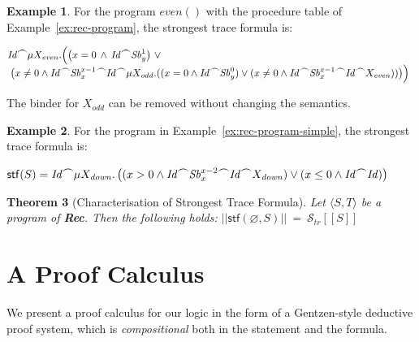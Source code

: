 \documentclass[10pt,a4paper]{amsart}
\newtheorem{theorem}{Theorem}[section]
\theoremstyle{definition}
\newtheorem{example}[theorem]{Example}
\newcommand{\denot}[1]{\left[\!\left[#1\right]\!\right]}
\newcommand{\fdenot}[1]{\left|\!\left|#1\right|\!\right|}
\newcommand{\trcdenot}[1]{\mathcal{S}_{\mathit{tr}}\!\denot{#1}}
\newcommand{\chop}[0]{\raisebox{1ex}{$\frown$}}
\newcommand{\stfs}[1]{\mathsf{stf} (#1)}
\newcommand{\stfh}[2]{\mathsf{stf}(#1, #2)}
\newcommand{\Rec}{\mbox{\bf Rec}}
\begin{document}
\begin{example}\label{ex:stf-rec}
  For the program $\mathit{even}()$ with the procedure table of
  Example~\ref{ex:rec-program}, the strongest trace formula is:

  \noindent
  $
  \begin{array}{@{}l@{}l}
    & \mathit{Id} \chop \mu X_\mathit{even}.\Bigl( 
    \bigl(x = 0 \,\land\,\mathit{Id} \chop \mathit{Sb}^{1}_{y}\bigl)\ \lor\\ 
   & \;\bigl(x \neq 0 \land
     \mathit{Id} \chop \mathit{Sb}^{x-1}_{x} \chop \mathit{Id} \chop \mu X_{\mathit{odd}}.((x = 0 \land \mathit{Id} \chop \mathit{Sb}^{0}_{y}) \lor
  (x \neq 0 \land 
     \mathit{Id} \chop \mathit{Sb}^{x-1}_{x} \chop\mathit{Id}\chop X_{\mathit{even}}))\bigr)\Bigr)
\end{array}
$

\noindent The binder for $X_{odd}$ can be removed without changing the
semantics.
\end{example}

\begin{example}\label{ex:stf-rec-simple}
  For the program in Example~\ref{ex:rec-program-simple}, the
  strongest trace formula is:\smallskip
  
  \noindent$\stfs{S} = 
      \mathit{Id} \chop 
      \mu X_\mathit{down}.\, 
          \bigl((x > 0 \land \mathit{Id} \chop 
                 \mathit{Sb}^{x-2}_x 
                 \chop \mathit{Id} \chop X_\mathit{down})
                \lor
                 (x \leq 0 \land \mathit{Id}\chop\mathit{Id})
                  \bigr)$ 
\end{example}


\begin{theorem}[Characterisation of Strongest Trace Formula]
\label{thm:stf-characterisation-rec}
Let $\langle S,T\rangle$ be a program of \Rec. Then the following holds:
%
$ \fdenot{\stfh{\varnothing}{S}} \>=\> \trcdenot{S} $
\end{theorem}

\section{A Proof Calculus}
\label{sec:proof-calculus}

We present a proof calculus for our logic in the form of a
Gentzen-style deductive proof system, which is \emph{compositional}
both in the statement and the formula.
\end{document}
